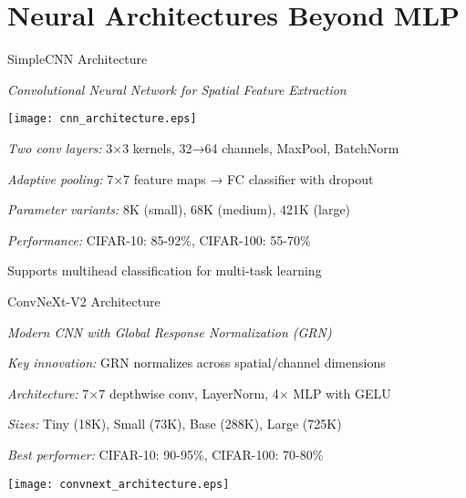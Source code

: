 
\section[toc={New Architectures}]{Neural Architectures Beyond MLP}

\begin{slidewhite}[\slideopts,toc={CNN}]{SimpleCNN Architecture}
  
  \emph{Convolutional Neural Network for Spatial Feature Extraction}
  
  \vspace{1em}

  \centerline{\texttt{[image: cnn\_architecture.eps]}}

  \begin{itemize}
    \mpitem \emph{Two conv layers:} 3×3 kernels, 32→64 channels, MaxPool, BatchNorm
    
    \mpitem \emph{Adaptive pooling:} 7×7 feature maps → FC classifier with dropout
    
    \mpitem \emph{Parameter variants:} 8K (small), 68K (medium), 421K (large)
    
    \mpitem \emph{Performance:} CIFAR-10: 85-92\%, CIFAR-100: 55-70\%
    
    \mpitem Supports multihead classification for multi-task learning
  \end{itemize}
  
\end{slidewhite}

\begin{slide}[\slideopts,toc={ConvNeXt}]{ConvNeXt-V2 Architecture}
  
  \emph{Modern CNN with Global Response Normalization (GRN)}
  
  \begin{itemize}
    \mpitem \emph{Key innovation:} GRN normalizes across spatial/channel dimensions
    
    \mpitem \emph{Architecture:} 7×7 depthwise conv, LayerNorm, 4× MLP with GELU
    
    \mpitem \emph{Sizes:} Tiny (18K), Small (73K), Base (288K), Large (725K)
    
    \mpitem \emph{Best performer:} CIFAR-10: 90-95\%, CIFAR-100: 70-80\%
  \end{itemize}
  
  \vspace{0.5em}
  \centerline{\texttt{[image: convnext\_architecture.eps]}}
\end{slide}

